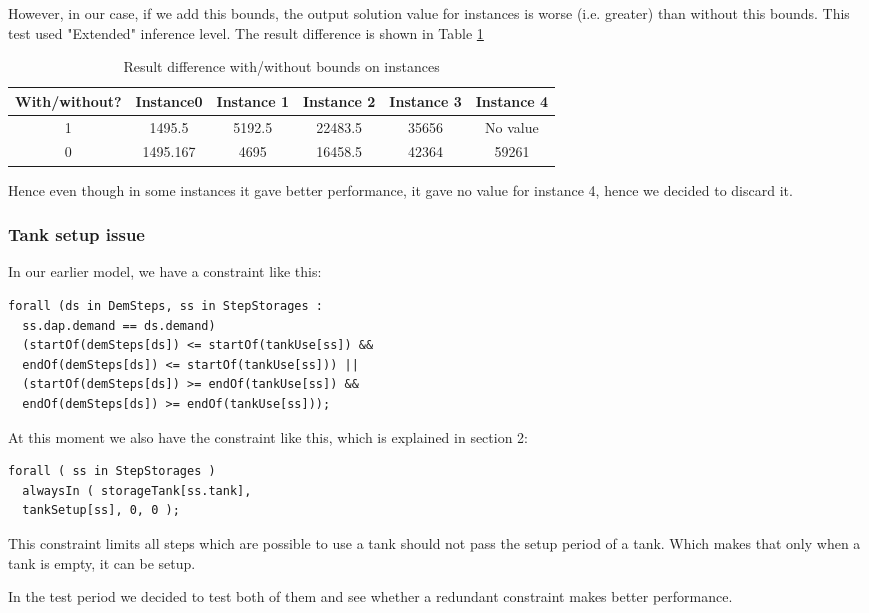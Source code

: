 \documentclass[a4paper, 12pt]{article}
\begin{document}
However, in our case, if we add this bounds, the output solution value for instances is worse (i.e. greater) than without this bounds. This test used "Extended" inference level. The result difference is shown in Table \ref{boundsdiff}
\begin{table}
    \centering
    \caption{Result difference with/without bounds on instances}
    \label{boundsdiff}
    \begin{tabular}{|c|c|c|c|c|c|}
    \hline
    With/without? & Instance0 & Instance 1 & Instance 2 & Instance 3 & Instance 4 \\
    \hline
    1 & 1495.5 & 5192.5 & 22483.5 & 35656 & No value \\
    \hline
    0 & 1495.167 & 4695 & 16458.5 & 42364 & 59261 \\
    \hline
    \end{tabular}
\end{table}

Hence even though in some instances it gave better performance, it gave no value for instance 4, hence we decided to discard it. 

\subsubsection{Tank setup issue}
In our earlier model, we have a constraint like this: 
\begin{lstlisting}
forall (ds in DemSteps, ss in StepStorages : 
  ss.dap.demand == ds.demand)
  (startOf(demSteps[ds]) <= startOf(tankUse[ss]) && 
  endOf(demSteps[ds]) <= startOf(tankUse[ss])) || 
  (startOf(demSteps[ds]) >= endOf(tankUse[ss]) && 
  endOf(demSteps[ds]) >= endOf(tankUse[ss]));
\end{lstlisting}
At this moment we also have the constraint like this, which is explained in section 2: 
\begin{lstlisting}
forall ( ss in StepStorages )
  alwaysIn ( storageTank[ss.tank], 
  tankSetup[ss], 0, 0 );
\end{lstlisting}
This constraint limits all steps which are possible to use a tank should not pass the setup period of a tank. Which makes that only when a tank is empty, it can be setup. 

In the test period we decided to test both of them and see whether a redundant constraint makes better performance. 
\end{document}
